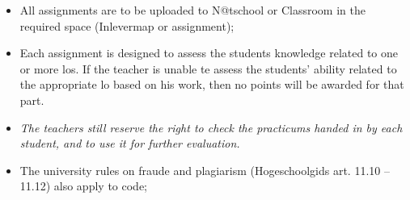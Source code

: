 \begin{itemize}
  \item All assignments are to be uploaded to N@tschool or Classroom in the required space (Inlevermap or assignment);
  \item Each assignment is designed to assess the students knowledge related to one or more \glspl{lo}.
          If the teacher is unable te assess the students' ability related to the appropriate \gls{lo} based on his work, then no points will be awarded for that part.
  \item \textit{The teachers still reserve the right to check the practicums handed in by each student, and to use it for further evaluation.}
  \item The university rules on fraude and plagiarism (Hogeschoolgids art. 11.10 -- 11.12) also apply to code;
\end{itemize}
